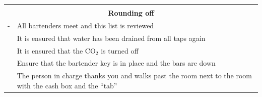 \documentclass[a4paper,10pt,oneside,article]{memoir}
\begin{document}
\vspace{0.5cm}
\noindent
\begin{tabular}{|l|l|}
    \hline
    \multicolumn{2}{|c|}{} \\
    \multicolumn{2}{|c|}{\Large \textbf{Rounding off}} \\
    \hline
    \begin{minipage}[t]{0.15\textwidth}
        {\color{white}-}
    \end{minipage} & 
    \begin{minipage}[t]{0.80\textwidth}
        All bartenders meet and this list is reviewed
    \end{minipage} \\
    \hline
    \begin{minipage}[t]{0.15\textwidth}
    \end{minipage} & 
    \begin{minipage}[t]{0.80\textwidth}
        It is ensured that water has been drained from all taps again
    \end{minipage} \\
    \hline
    \begin{minipage}[t]{0.15\textwidth}
    \end{minipage} & 
    \begin{minipage}[t]{0.80\textwidth}
        It is ensured that the CO$_2$ is turned off
    \end{minipage} \\
    \hline
    \begin{minipage}[t]{0.15\textwidth}
    \end{minipage} & 
    \begin{minipage}[t]{0.80\textwidth}
        Ensure that the bartender key is in place and the bars are down
    \end{minipage} \\
    \hline
    \begin{minipage}[t]{0.15\textwidth}
    \end{minipage} & 
    \begin{minipage}[t]{0.80\textwidth}
        The person in charge thanks you and walks past the room next to the room 
        with the cash box and the ``tab''
    \end{minipage} \\
    \hline
\end{tabular}

\vfill
\end{document}
